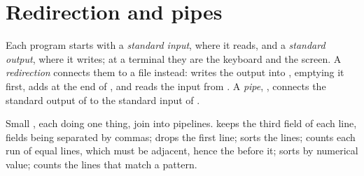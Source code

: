 \section{Redirection and pipes}\label{sec:g11:os-and-command-line:pipes}

\begin{definition}\label{def:g11:os-and-command-line:redirection}
Each program starts with a \emph{standard input}, where it reads, and a \emph{standard
output}, where it writes; at a terminal they are the keyboard and the screen. A \emph{redirection}
connects them to a file instead:  writes the output into , emptying it first,  adds at
the end of , and  reads the input from . A \emph{pipe}, ,
connects the standard output of  to the standard input of .
\end{definition}

\label{out:g11:os-and-command-line:redirect}

Small , each doing one thing, join into pipelines.  keeps the third field of each line,
fields being separated by commas;  drops the first line;  sorts the lines;
 counts each run of equal lines, which must be adjacent, hence the  before it;  sorts by
numerical value;  counts the lines that match a pattern.

\label{out:g11:os-and-command-line:pipes}


